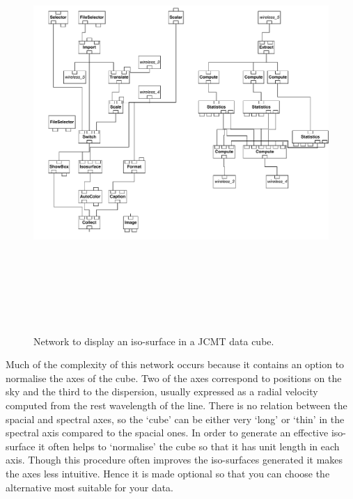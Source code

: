 \documentclass[twoside,11pt]{starlink}
\begin{document}
\begin{enumerate}
  \begin{figure}[htbp]

  \begin{center}
  \leavevmode
  \includegraphics[height=450pt,angle=90]{sc2_jcmtsurface}
  \end{center}

  \caption[Network to display an iso-surface in a JCMT data cube.]
   {Network to display an iso-surface in a JCMT data cube.
   \label{JCMTSURFACE} }

  \end{figure}

   Much of the complexity of this network occurs because it contains an
   option to normalise the axes of the cube.  Two of the axes correspond
   to positions on the sky and the third to the dispersion, usually
   expressed as a radial velocity computed from the rest wavelength of
   the line.  There is no relation between the spacial and spectral
   axes, so the `cube' can be either very `long' or `thin' in the
   spectral axis compared to the spacial ones.  In order to generate
   an effective iso-surface it often helps to `normalise' the cube
   so that it has unit length in each axis.  Though this procedure
   often improves the iso-surfaces generated it makes the axes less
   intuitive.  Hence it is made optional so that you can choose the
   alternative most suitable for your data.


\end{enumerate}
\end{document}
